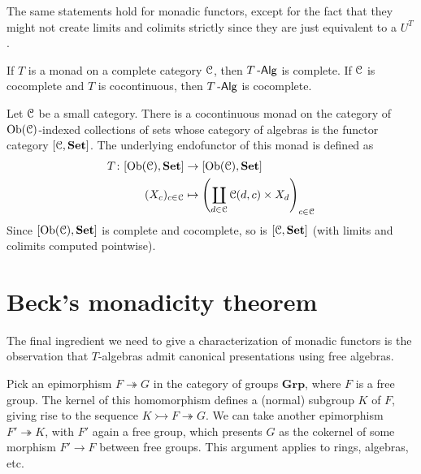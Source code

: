 \documentclass[a4paper,11pt,oneside,openany]{scrbook}
\begin{document}
\begin{rmk}
	The same statements hold for monadic functors, except for the fact that they might not create limits and colimits strictly since they are just equivalent to a $U^T$.
\end{rmk}

\begin{rmk}
	If $T$ is a monad on a complete category $\operatorname{\mathcal{C}}$, then $T\operatorname{-\mathsf{Alg}}$ is complete. If $\operatorname{\mathcal{C}}$ is cocomplete and $T$ is cocontinuous, then $T\operatorname{-\mathsf{Alg}}$ is cocomplete.
\end{rmk}

\begin{exmp}
	Let $\operatorname{\mathcal{C}}$ be a small category. There is a cocontinuous monad on the category of $\operatorname{Ob}(\operatorname{\mathcal{C}})$-indexed collections of sets whose category of algebras is the functor category $[\operatorname{\mathcal{C}},{\normalfont\textbf{Set}}]$. The underlying endofunctor of this monad is defined as 
	\begin{align*}
	T\colon[\operatorname{Ob}(\operatorname{\mathcal{C}}),{\normalfont\textbf{Set}}]&\to[\operatorname{Ob}(\operatorname{\mathcal{C}}),{\normalfont\textbf{Set}}] \\
	(X_c)_{c\in\operatorname{\mathcal{C}}}&\mapsto \left(\coprod_{d\in\operatorname{\mathcal{C}}}\operatorname{\mathcal{C}}(d,c)\times X_d\right)_{c\in\operatorname{\mathcal{C}}}
	\end{align*}
	Since $[\operatorname{Ob}(\operatorname{\mathcal{C}}),{\normalfont\textbf{Set}}]$ is complete and cocomplete, so is $[\operatorname{\mathcal{C}},{\normalfont\textbf{Set}}]$ (with limits and colimits computed pointwise).
\end{exmp}
 
\section{Beck’s monadicity theorem}

The final ingredient we need to give a characterization of monadic functors is the observation that $T$-algebras admit canonical presentations using free algebras.

\begin{exmp}
	Pick an epimorphism $F\twoheadrightarrow G$ in the category of groups $\mathbf{Grp}$, where $F$ is a free group. The kernel of this homomorphism defines a (normal) subgroup $K$ of $F$, giving rise to the sequence $K\rightarrowtail F\twoheadrightarrow G$. We can take another epimorphism $F'\twoheadrightarrow K$, with $F'$ again a free group, which presents $G$ as the cokernel of some morphism $F'\to F$ between free groups. This argument applies to rings, algebras, etc.
\end{exmp}
\end{document}
